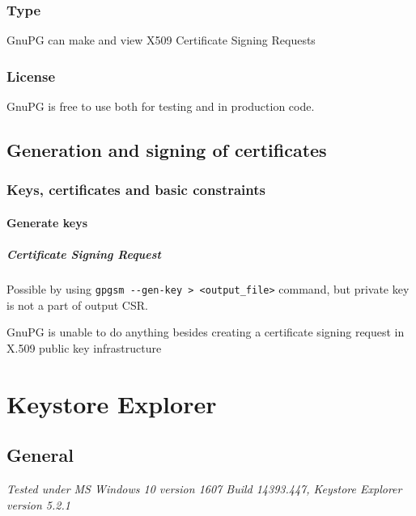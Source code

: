\documentclass[10pt, a4paper]{report}
\begin{document}
  \subsection{Type}
GnuPG can make and view X509 Certificate Signing Requests

  \subsection{License}
GnuPG is free to use both for testing and in production code.
  
\section{Generation and signing of certificates}

  \subsection{Keys, certificates and basic constraints}
  
    \subsubsection{Generate keys}
    
      \paragraph{Certificate Signing Request}
Possible by using \verb+gpgsm --gen-key > <output_file>+ command, but private key is not a part of output CSR.     

GnuPG is unable to do anything besides creating a certificate signing request in X.509 public key infrastructure

\chapter{Keystore Explorer}

\section{General}

\textit{Tested under MS Windows 10 version 1607 Build 14393.447, Keystore Explorer version 5.2.1}
\end{document}
